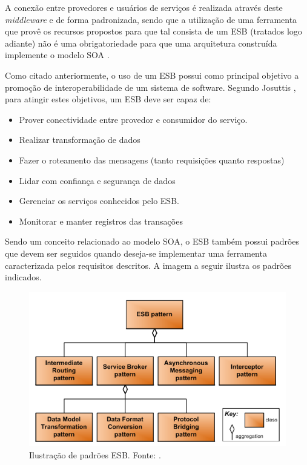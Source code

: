 A conexão entre provedores e usuários de serviços é realizada através deste \textit{middleware} e de forma padronizada, sendo que a utilização de uma ferramenta que provê os recursos propostos para que tal consista de um ESB (tratados logo adiante) não é uma obrigatoriedade para que uma arquitetura construída implemente o modelo SOA \cite{lewis_getting_2010}.

Como citado anteriormente, o uso de um ESB possui como principal objetivo a promoção de interoperabilidade de um sistema de software. Segundo Josuttis \cite{josuttis_soa_2007}, para atingir estes objetivos, um ESB deve ser capaz de:

\begin{itemize}
\item Prover conectividade entre provedor e consumidor do serviço.
\item Realizar transformação de dados
\item Fazer o roteamento das mensagens (tanto requisições quanto respostas)
\item Lidar com confiança e segurança de dados
\item Gerenciar os serviços conhecidos pelo ESB.
\item Monitorar e manter registros das transações
\end{itemize}

Sendo um conceito relacionado ao modelo SOA, o ESB também possui padrões que devem ser seguidos quando deseja-se implementar uma ferramenta caracterizada pelos requisitos descritos. A imagem a seguir ilustra os padrões indicados.

\begin{figure}[htb]
\centering
\includegraphics[scale=0.5]{figuras/padrao_ESB.png}
\caption{Ilustração de padrões ESB. Fonte: \cite{bianco_architecting_2011}.}
\label{padrao_ESB}
\end{figure}

